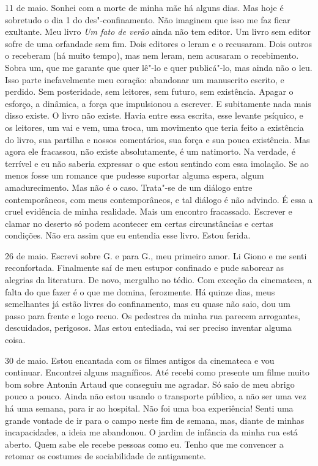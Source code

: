 11 de maio. Sonhei com a morte de minha mãe há alguns dias. Mas hoje é
sobretudo o dia 1 do des"-confinamento. Não imaginem que isso me faz
ficar exultante. Meu livro \emph{Um fato de verão} ainda não tem editor.
Um livro sem editor sofre de uma orfandade sem fim. Dois editores o
leram e o recusaram. Dois outros o receberam (há muito tempo), mas nem
leram, nem acusaram o recebimento. Sobra um, que me garante que quer
lê"-lo e quer publicá"-lo, mas ainda não o leu. Isso parte inefavelmente
meu coração: abandonar um manuscrito escrito, e perdido. Sem
posteridade, sem leitores, sem futuro, sem existência. Apagar o esforço,
a dinâmica, a força que impulsionou a escrever. E subitamente nada mais
disso existe. O livro não existe. Havia entre essa escrita, esse levante
psíquico, e os leitores, um vai e vem, uma troca, um movimento que teria
feito a existência do livro, sua partilha e nossos comentários, sua
força e sua pouca existência. Mas agora ele fracassou, não existe
absolutamente, é um natimorto. Na verdade, é terrível e eu não saberia
expressar o que estou sentindo com essa imolação. Se ao menos fosse um
romance que pudesse suportar alguma espera, algum amadurecimento. Mas
não é o caso. Trata"-se de um diálogo entre contemporâneos, com meus
contemporâneos, e tal diálogo é não advindo. É essa a cruel evidência de
minha realidade. Mais um encontro fracassado. Escrever e clamar no
deserto só podem acontecer em certas circunstâncias e certas condições.
Não era assim que eu entendia esse livro. Estou ferida.

26 de maio. Escrevi sobre G. e para G., meu primeiro amor. Li Giono e me
senti reconfortada. Finalmente saí de meu estupor confinado e pude
saborear as alegrias da literatura. De novo, mergulho no tédio. Com
exceção da cinemateca, a falta do que fazer é o que me domina,
ferozmente. Há quinze dias, meus semelhantes já estão livres do
confinamento, mas eu quase não saio, dou um passo para frente e logo
recuo. Os pedestres da minha rua parecem arrogantes, descuidados,
perigosos. Mas estou entediada, vai ser preciso inventar alguma coisa.

30 de maio. Estou encantada com os filmes antigos da cinemateca e vou
continuar. Encontrei alguns magníficos. Até recebi como presente um
filme muito bom sobre Antonin Artaud que conseguiu me agradar. Só saio
de meu abrigo pouco a pouco. Ainda não estou usando o transporte
público, a não ser uma vez há uma semana, para ir ao hospital. Não foi
uma boa experiência! Senti uma grande vontade de ir para o campo neste
fim de semana, mas, diante de minhas incapacidades, a ideia me
abandonou. O jardim de infância da minha rua está aberto. Quem sabe ele
recebe pessoas como eu. Tenho que me convencer a retomar os costumes de
sociabilidade de antigamente.


